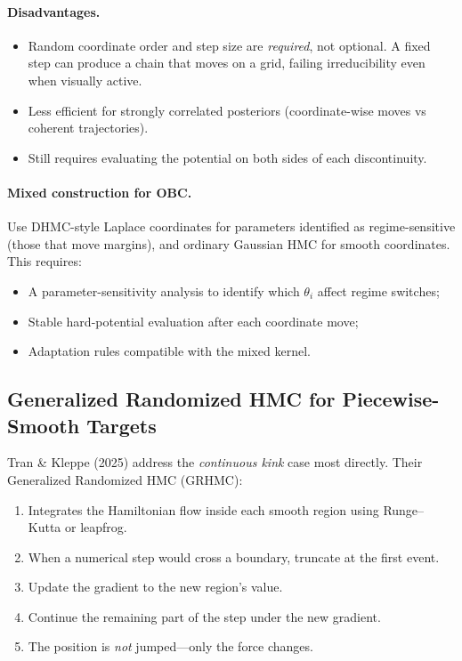 \paragraph{Disadvantages.}
\begin{itemize}
  \item Random coordinate order and step size are \emph{required}, not
    optional. A fixed step can produce a chain that moves on a grid, failing
    irreducibility even when visually active.
  \item Less efficient for strongly correlated posteriors (coordinate-wise
    moves vs coherent trajectories).
  \item Still requires evaluating the potential on both sides of each
    discontinuity.
\end{itemize}

\paragraph{Mixed construction for OBC.}
Use DHMC-style Laplace coordinates for parameters identified as
regime-sensitive (those that move margins), and ordinary Gaussian HMC for
smooth coordinates. This requires:
\begin{itemize}
  \item A parameter-sensitivity analysis to identify which $\theta_i$ affect
    regime switches;
  \item Stable hard-potential evaluation after each coordinate move;
  \item Adaptation rules compatible with the mixed kernel.
\end{itemize}

\subsection{Generalized Randomized HMC for Piecewise-Smooth Targets}

Tran \& Kleppe (2025) address the \emph{continuous kink} case most directly.
Their Generalized Randomized HMC (GRHMC):
\begin{enumerate}
  \item Integrates the Hamiltonian flow inside each smooth region using
    Runge--Kutta or leapfrog.
  \item When a numerical step would cross a boundary, truncate at the first
    event.
  \item Update the gradient to the new region's value.
  \item Continue the remaining part of the step under the new gradient.
  \item The position is \emph{not} jumped—only the force changes.
\end{enumerate}

